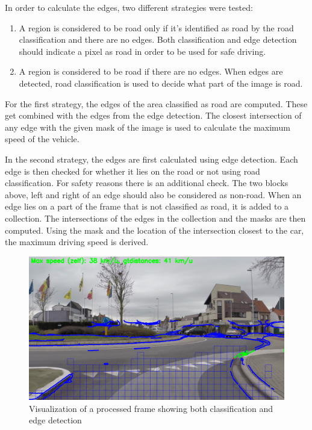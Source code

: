 \documentclass[runningheads,a4paper]{llncs}
\begin{document}
In order to calculate the edges, two different strategies were tested:
\begin{enumerate}
\item  A region is considered to be road only if it's identified as road by the road classification and there are no edges. Both classification and edge detection should indicate a pixel as road in order to be used for safe driving.
\item A region is considered to be road if there are no edges. When edges are detected, road classification is used to decide what part of the image is road. 
\end{enumerate} 

For the first strategy, the edges of the area classified as road are computed. These get combined with the edges from the edge detection. The closest intersection of any edge with the given mask of the image is used to calculate the maximum speed of the vehicle. 

In the second strategy, the edges are first calculated using edge detection. Each edge is then checked for whether it lies on the road or not using road classification. For safety reasons there is an additional check. The two blocks above, left and right of an edge should also be considered as non-road. When an edge lies on a part of the frame that is not classified as road, it is added to a collection. The intersections of the edges in the collection and the masks are then computed. Using the mask and the location of the intersection closest to the car, the maximum driving speed is derived.

\begin{figure}[t]
  \centering
  \includegraphics[width=.9\textwidth]{fig/frame00025.png}
  \caption{Visualization of a processed frame showing both classification and edge detection}
  \label{visualization}
\end{figure}
\end{document}
